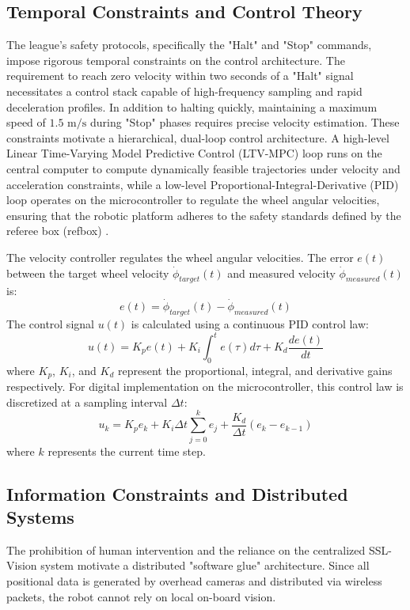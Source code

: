 \documentclass[a4paper,twoside,12pt]{report}
\begin{document}
\subsection{Temporal Constraints and Control Theory}
The league's safety protocols, specifically the "Halt" and "Stop" commands, impose rigorous temporal constraints on the control architecture. The requirement to reach zero velocity within two seconds of a "Halt" signal necessitates a control stack capable of high-frequency sampling and rapid deceleration profiles. In addition to halting quickly, maintaining a maximum speed of $1.5\text{ m/s}$ during "Stop" phases requires precise velocity estimation. These constraints motivate a hierarchical, dual-loop control architecture. A high-level Linear Time-Varying Model Predictive Control (LTV-MPC) loop runs on the central computer to compute dynamically feasible trajectories under velocity and acceleration constraints, while a low-level Proportional-Integral-Derivative (PID) loop operates on the microcontroller to regulate the wheel angular velocities, ensuring that the robotic platform adheres to the safety standards defined by the referee box (refbox) \citep{pacheco2015testing}.

The velocity controller regulates the wheel angular velocities. The error $e(t)$ between the target wheel velocity $\dot{\phi}_{target}(t)$ and measured velocity $\dot{\phi}_{measured}(t)$ is:
\begin{equation}
e(t) = \dot{\phi}_{target}(t) - \dot{\phi}_{measured}(t)
\label{eq:error}
\end{equation}
The control signal $u(t)$ is calculated using a continuous PID control law:
\begin{equation}
u(t) = K_p e(t) + K_i \int_{0}^{t} e(\tau) d\tau + K_d \frac{de(t)}{dt}
\label{eq:pid}
\end{equation}
where $K_p$, $K_i$, and $K_d$ represent the proportional, integral, and derivative gains respectively. For digital implementation on the microcontroller, this control law is discretized at a sampling interval $\Delta t$:
\begin{equation}
u_k = K_p e_k + K_i \Delta t \sum_{j=0}^{k} e_j + \frac{K_d}{\Delta t} (e_k - e_{k-1})
\label{eq:discrete_pid}
\end{equation}
where $k$ represents the current time step.

\subsection{Information Constraints and Distributed Systems}
The prohibition of human intervention and the reliance on the centralized SSL-Vision system motivate a distributed "software glue" architecture. Since all positional data is generated by overhead cameras and distributed via wireless packets, the robot cannot rely on local on-board vision.
\end{document}
